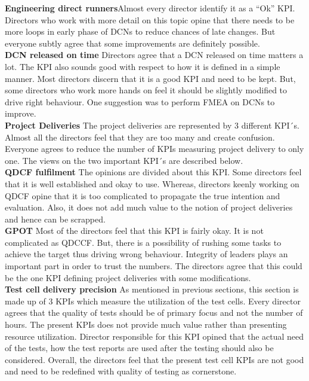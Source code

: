 \begin{enumerate}
\textbf{Engineering direct runners}Almost every director identify it as a “Ok” KPI. Directors who work with more detail on this topic opine that there needs to be more loops in early phase of DCNs to reduce chances of late changes. But everyone subtly agree that some improvements are definitely possible.\\

\textbf{DCN released on time} Directors agree that a DCN released on time matters a lot. The KPI also sounds good with respect to how it is defined in a simple manner. Most directors discern that it is a good KPI and need to be kept. But, some directors who work more hands on feel it should be slightly modified to drive right behaviour. One suggestion was to perform FMEA on DCNs to improve.\\

\textbf{Project Deliveries} The project deliveries are represented by 3 different KPI´s. Almost all the directors feel that they are too many and create confusion. Everyone agrees to reduce the number of KPIs measuring project delivery to only one. The views on the two important KPI´s are described below.\\

\textbf{QDCF fulfilment} The opinions are divided about this KPI. Some directors feel that it is well established and okay to use. Whereas, directors keenly working on QDCF opine that it is too complicated to propagate the true intention and evaluation. Also, it does not add much value to the notion of project deliveries and hence can be scrapped.\\

\textbf{GPOT} Most of the directors feel that this KPI is fairly okay. It is not complicated as QDCCF. But, there is a possibility of rushing some tasks to achieve the target thus driving wrong behaviour. Integrity of leaders plays an important part in order to trust the numbers. The directors agree that this could be the one KPI defining project deliveries with some modifications.\\

\textbf{Test cell delivery precision} As mentioned in previous sections, this section is made up of 3 KPIs which measure the utilization of the test cells. Every director agrees that the quality of tests should be of primary focus and not the number of hours. The present KPIs does not provide much value rather than presenting resource utilization. Director responsible for this KPI opined that the actual need of the tests, how the test reports are used after the testing should also be considered. Overall, the directors feel that the present test cell KPIs are not good and need to be redefined with quality of testing as cornerstone.\\


\end{enumerate}
